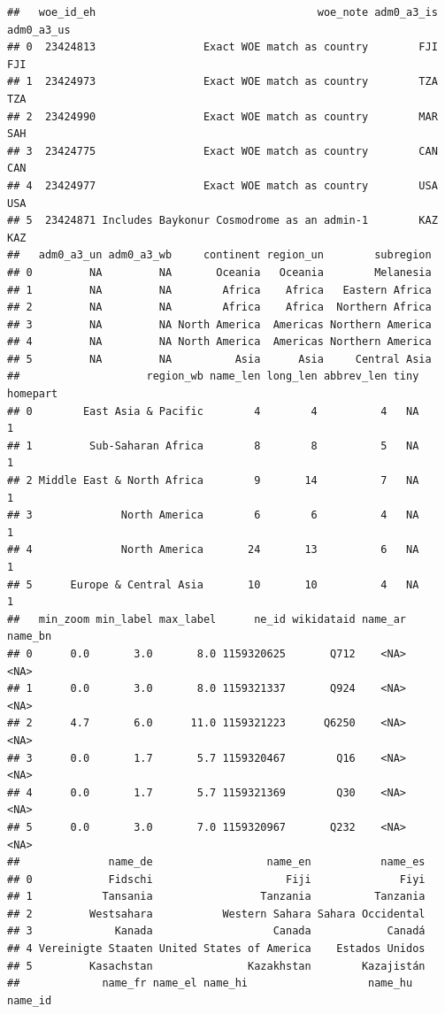 \documentclass[
]{article}
\begin{document}
\begin{verbatim}
##   woe_id_eh                                   woe_note adm0_a3_is adm0_a3_us
## 0  23424813                 Exact WOE match as country        FJI        FJI
## 1  23424973                 Exact WOE match as country        TZA        TZA
## 2  23424990                 Exact WOE match as country        MAR        SAH
## 3  23424775                 Exact WOE match as country        CAN        CAN
## 4  23424977                 Exact WOE match as country        USA        USA
## 5  23424871 Includes Baykonur Cosmodrome as an admin-1        KAZ        KAZ
##   adm0_a3_un adm0_a3_wb     continent region_un        subregion
## 0         NA         NA       Oceania   Oceania        Melanesia
## 1         NA         NA        Africa    Africa   Eastern Africa
## 2         NA         NA        Africa    Africa  Northern Africa
## 3         NA         NA North America  Americas Northern America
## 4         NA         NA North America  Americas Northern America
## 5         NA         NA          Asia      Asia     Central Asia
##                    region_wb name_len long_len abbrev_len tiny homepart
## 0        East Asia & Pacific        4        4          4   NA        1
## 1         Sub-Saharan Africa        8        8          5   NA        1
## 2 Middle East & North Africa        9       14          7   NA        1
## 3              North America        6        6          4   NA        1
## 4              North America       24       13          6   NA        1
## 5      Europe & Central Asia       10       10          4   NA        1
##   min_zoom min_label max_label      ne_id wikidataid name_ar name_bn
## 0      0.0       3.0       8.0 1159320625       Q712    <NA>    <NA>
## 1      0.0       3.0       8.0 1159321337       Q924    <NA>    <NA>
## 2      4.7       6.0      11.0 1159321223      Q6250    <NA>    <NA>
## 3      0.0       1.7       5.7 1159320467        Q16    <NA>    <NA>
## 4      0.0       1.7       5.7 1159321369        Q30    <NA>    <NA>
## 5      0.0       3.0       7.0 1159320967       Q232    <NA>    <NA>
##              name_de                  name_en           name_es
## 0            Fidschi                     Fiji              Fiyi
## 1           Tansania                 Tanzania          Tanzania
## 2         Westsahara           Western Sahara Sahara Occidental
## 3             Kanada                   Canada            Canadá
## 4 Vereinigte Staaten United States of America    Estados Unidos
## 5         Kasachstan               Kazakhstan        Kazajistán
##             name_fr name_el name_hi                   name_hu         name_id

\end{verbatim}
\end{document}

